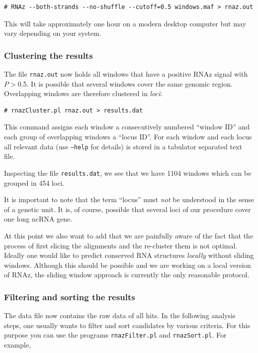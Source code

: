 \documentclass[11pt]{article}
\begin{document}
\begin{verbatim}
# RNAz --both-strands --no-shuffle --cutoff=0.5 windows.maf > rnaz.out
\end{verbatim}

This will take approximately one hour on a modern desktop computer but may
vary depending on your system.

\subsubsection{Clustering the results}
\label{sec:clustering-results}

The file \texttt{rnaz.out} now holds all windows that have a positive RNAz
signal with $P>$0.5. It is possible that several windows cover the same
genomic region. Overlapping windows are therefore clustered in \emph{loci}:

\begin{verbatim}
# rnazCluster.pl rnaz.out > results.dat 
\end{verbatim}

This command assigns each window a consecutively numbered ``window ID'' and
each group of overlapping windows a ``locus ID''. For each window and each
locus all relevant data (use \texttt{--help} for details) is stored in a
tabulator separated text file. 

Inspecting the file \texttt{results.dat}, we see that we have 1104 windows
which can be grouped in 454 loci.

It is important to note that the term ``locus'' must \emph{not} be
understood in the sense of a genetic unit. It is, of course, possible that
several loci of our procedure cover one long ncRNA gene.

At this point we also want to add that we are painfully aware of the fact
that the process of first slicing the alignments and the re-cluster them is
not optimal. Ideally one would like to predict conserved RNA structures
\emph{locally} without sliding windows. Although this should be possible
\cite{hofacker04} and we are working on a local version of RNAz, the
sliding window approach is currently the only reasonable protocol.

\subsubsection{Filtering and sorting the results}
\label{sec:filt-sort-results}

The data file now contains the raw data of all hits. In the following
analysis steps, one usually wants to filter and sort candidates by various
criteria. For this purpose you can use the programs \texttt{rnazFilter.pl}
and \texttt{rnazSort.pl}. For example, 
\end{document}
